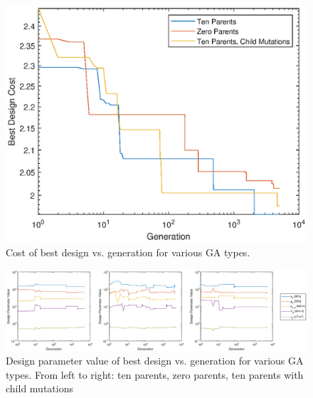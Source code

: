 \documentclass[a4paper,12pt]{report}
\begin{document}
\begin{figure}[H]
\begin{nscenter}
  \includegraphics[width=0.75\linewidth]{2-1.eps}
  \caption{Cost of best design vs. generation for various GA types.}
  \end{nscenter}
\end{figure}

\begin{figure}[H]
\begin{nscenter}
  \includegraphics[width=1.2\linewidth]{3-1.eps}
  \caption{Design parameter value of best design vs. generation for various GA types. From left to right: ten parents, zero parents, ten parents with child mutations}
  \end{nscenter}
\end{figure}

\begin{table}[H]
\centering
\caption{Fractional difference between achieved and desired design parameter for various GA types.}
\end{table}
\end{document}
